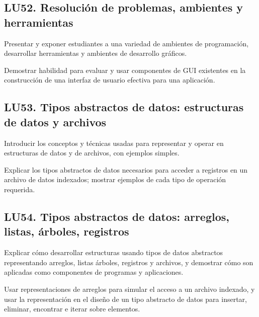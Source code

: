 \subsection{LU52. Resolución de problemas, ambientes y herramientas}\label{sec:BOK-LU52}\label{sec:LU52}
\begin{LearningUnit}
\begin{LUGoal}
\item Presentar y exponer estudiantes a una variedad de ambientes de programación, desarrollar herramientas y ambientes de desarrollo gráficos.
\end{LUGoal}

\begin{LUObjective}
\item Demostrar habilidad para evaluar y usar componentes de GUI existentes en la construcción de una interfaz de usuario efectiva para una aplicación.
\end{LUObjective}
\end{LearningUnit}

\subsection{LU53. Tipos abstractos de datos: estructuras de datos y archivos}\label{sec:BOK-LU53}\label{sec:LU53}
\begin{LearningUnit}
\begin{LUGoal}
\item Introducir los conceptos y técnicas usadas para representar y operar en estructuras de datos y de archivos, con ejemplos simples.
\end{LUGoal}

\begin{LUObjective}
\item Explicar los tipos abstractos de datos necesarios para acceder a registros en un archivo de datos indexados; mostrar ejemplos de cada tipo de operación requerida.
\end{LUObjective}
\end{LearningUnit}

\subsection{LU54. Tipos abstractos de datos: arreglos, listas, árboles, registros}\label{sec:BOK-LU54}\label{sec:LU54}
\begin{LearningUnit}
\begin{LUGoal}
\item Explicar cómo desarrollar estructuras usando tipos de datos abstractos representando arreglos, listas árboles, registros y archivos, y demostrar cómo son aplicadas como componentes de programas y aplicaciones.
\end{LUGoal}

\begin{LUObjective}
\item Usar representaciones de arreglos para simular el acceso a un archivo indexado, y usar la representación en el diseño de un tipo abstracto de datos para insertar, eliminar, encontrar e iterar sobre elementos.
\end{LUObjective}
\end{LearningUnit}

